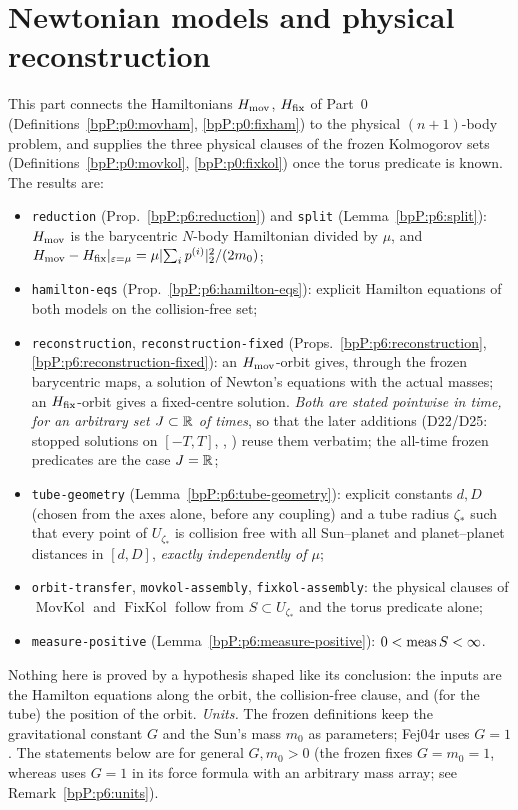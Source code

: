 \section{Newtonian models and physical reconstruction}\label{bpP:p6}
\begingroup\sloppy

This part connects the Hamiltonians $H_{\rm mov}$, $H_{\rm fix}$ of Part~0 (Definitions~\ref{bpP:p0:movham}, \ref{bpP:p0:fixham}) to the physical $(n+1)$-body problem, and
supplies the three physical clauses of the frozen Kolmogorov sets (Definitions~\ref{bpP:p0:movkol}, \ref{bpP:p0:fixkol}) once the torus predicate is known. The results are:
\begin{itemize}
\item \texttt{reduction} (Prop.~\ref{bpP:p6:reduction}) and \texttt{split} (Lemma~\ref{bpP:p6:split}): $H_{\rm mov}$ is the barycentric $N$-body Hamiltonian divided by $\mu$, and
$H_{\rm mov}-H_{\rm fix}|_{\varepsilon=\mu}=\mu\lvert \sum_ip^{(i)}\rvert_2^2/(2m_0)$;
\item \texttt{hamilton-eqs} (Prop.~\ref{bpP:p6:hamilton-eqs}): explicit Hamilton equations of both models on the collision-free set;
\item \texttt{reconstruction}, \texttt{reconstruction-fixed} (Props.~\ref{bpP:p6:reconstruction}, \ref{bpP:p6:reconstruction-fixed}): an $H_{\rm mov}$-orbit gives, through the frozen barycentric maps, a solution of Newton's equations with the actual masses; an $H_{\rm fix}$-orbit gives a fixed-centre solution. \emph{Both are stated pointwise in time, for an arbitrary set $J\subset\mathbb{R}$ of times}, so that the later additions (D22/D25: stopped solutions on $[-T,T]$, , ) reuse them verbatim; the all-time frozen predicates are the case $J=\mathbb{R}$;
\item \texttt{tube-geometry} (Lemma~\ref{bpP:p6:tube-geometry}): explicit constants $d,D$ (chosen from the axes alone, before any coupling) and a tube radius $\zeta_*$ such that every point of $U_{\zeta_*}$ is collision free with all Sun--planet and planet--planet distances in $[d,D]$, \emph{exactly independently of $\mu$};
\item \texttt{orbit-transfer}, \texttt{movkol-assembly}, \texttt{fixkol-assembly}: the physical clauses of $\operatorname{MovKol}$ and $\operatorname{FixKol}$ follow from $S\subset U_{\zeta_*}$ and the torus predicate alone;
\item \texttt{measure-positive} (Lemma~\ref{bpP:p6:measure-positive}): $0<\operatorname{meas} S<\infty$.
\end{itemize}
Nothing here is proved by a hypothesis shaped like its conclusion: the inputs are the Hamilton equations along the orbit, the collision-free clause, and (for the tube) the position of the orbit.
\emph{Units.} The frozen definitions keep the gravitational constant $G$ and the Sun's mass $m_0$ as parameters; Fej04r uses $G=1$. The statements below are for general $G,m_0>0$ (the frozen  fixes $G=m_0=1$, whereas  uses $G=1$ in its force formula with an arbitrary mass array; see Remark~\ref{bpP:p6:units}).

